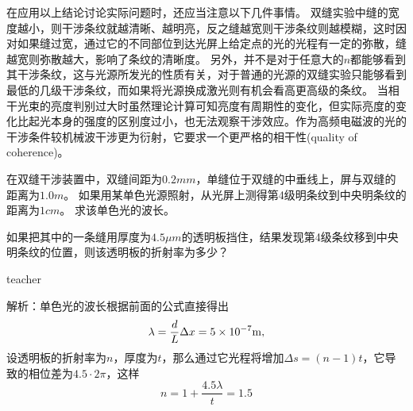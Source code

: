 在应用以上结论讨论实际问题时，还应当注意以下几件事情。
双缝实验中缝的宽度越小，则干涉条纹就越清晰、越明亮，反之缝越宽则干涉条纹则越模糊，这时因对如果缝过宽，通过它的不同部位到达光屏上给定点的光的光程有一定的弥散，缝越宽则弥散越大，影响了条纹的清晰度。
另外，并不是对于任意大的$n$都能够看到其干涉条纹，这与光源所发光的性质有关，对于普通的光源的双缝实验只能够看到最低的几级干涉条纹，而如果将光源换成激光则有机会看高更高级的条纹。
当相干光束的亮度判别过大时虽然理论计算可知亮度有周期性的变化，但实际亮度的变化比起光本身的强度的区别度过小，也无法观察干涉效应。作为高频电磁波的光的干涉条件较机械波干涉更为衍射，它要求一个更严格的{\heiti 相干性}(quality of coherence)。













\begin{example}

在双缝干涉装置中，双缝间距为$0.2\unit{mm}$，单缝位于双缝的中垂线上，屏与双缝的距离为$1.0\unit{m}$。
如果用某单色光源照射，从光屏上测得第4级明条纹到中央明条纹的距离为$1\unit{cm}$。
求该单色光的波长。

如果把其中的一条缝用厚度为$4.5\unit{\mu m}$的透明板挡住，结果发现第4级条纹移到中央明条纹的位置，则该透明板的折射率为多少？
\begin{taggedblock}{teacher}

解析：单色光的波长根据前面的公式直接得出
\[
\lambda = \frac{d}{L}\Delta x = 5\times 10^{-7}{\rm{m}},
\]
设透明板的折射率为$n$，厚度为$t$，那么通过它光程将增加$\Delta s = (n-1)t$，它导致的相位差为$4.5\cdot 2\pi$，这样
\[
n=1+\frac{4.5\lambda}{t}  = 1.5
\]
\end{taggedblock}
\end{example}






